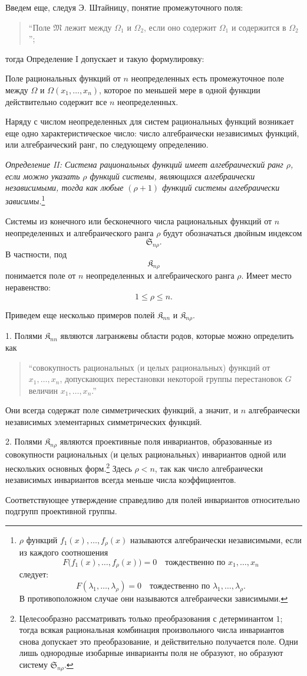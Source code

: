 \documentclass[11pt]{article}
\providecommand{\Kfield}{\mathfrak{K}}
\providecommand{\Ssys}{\mathfrak{S}}
\providecommand{\Mfield}{\mathfrak{M}}
\begin{document}
Введем еще, следуя Э. Штайницу, понятие промежуточного поля:
\begin{quote}
``Поле $\Mfield$ лежит между $\Omega_1$ и $\Omega_2$, если оно содержит $\Omega_1$ и содержится в $\Omega_2$'';
\end{quote}
тогда Определение I допускает и такую формулировку:

Поле рациональных функций от $n$ неопределенных есть промежуточное поле между $\Omega$ и $\Omega(x_1,\ldots,x_n)$, которое по меньшей мере в одной функции действительно содержит все $n$ неопределенных.

Наряду с числом неопределенных для систем рациональных функций возникает еще одно характеристическое число: число алгебраически независимых функций, или алгебраический ранг, по следующему определению.

\emph{Определение II: Система рациональных функций имеет алгебраический ранг $\rho$, если можно указать $\rho$ функций системы, являющихся алгебраически независимыми, тогда как любые $(\rho+1)$ функций системы алгебраически зависимы.}\footnote{$\rho$ функций $f_1(x),\ldots,f_\rho(x)$ называются алгебраически независимыми, если из каждого соотношения
\[
F\bigl(f_1(x),\ldots,f_\rho(x)\bigr)=0\quad\text{тождественно по }x_1,\ldots,x_n
\]
следует:
\[
F(\lambda_1,\ldots,\lambda_\rho)=0\quad\text{тождественно по }\lambda_1,\ldots,\lambda_\rho.
\]
В противоположном случае они называются алгебраически зависимыми.}

Системы из конечного или бесконечного числа рациональных функций от $n$ неопределенных и алгебраического ранга $\rho$ будут обозначаться двойным индексом
\[
  \Ssys_{n\rho}.
\]
В частности, под
\[
  \Kfield_{n\rho}
\]
понимается поле от $n$ неопределенных и алгебраического ранга $\rho$. Имеет место неравенство:
\[
  1\leq \rho\leq n.
\]

Приведем еще несколько примеров полей $\Kfield_{nn}$ и $\Kfield_{n\rho}$.

1. Полями $\Kfield_{nn}$ являются лагранжевы области родов, которые можно определить как
\begin{quote}
``совокупность рациональных (и целых рациональных) функций от $x_1,\ldots,x_n$, допускающих перестановки некоторой группы перестановок $G$ величин $x_1,\ldots,x_n$.''
\end{quote}
Они всегда содержат поле симметрических функций, а значит, и $n$ алгебраически независимых элементарных симметрических функций.

2. Полями $\Kfield_{n\rho}$ являются проективные поля инвариантов, образованные из совокупности рациональных (и целых рациональных) инвариантов одной или нескольких основных форм.\footnote{Целесообразно рассматривать только преобразования с детерминантом $1$; тогда всякая рациональная комбинация произвольного числа инвариантов снова допускает это преобразование, и действительно получается поле. Одни лишь однородные изобарные инварианты поля не образуют, но образуют систему $\Ssys_{n\rho}$.} Здесь $\rho<n$, так как число алгебраически независимых инвариантов всегда меньше числа коэффициентов.

Соответствующее утверждение справедливо для полей инвариантов относительно подгрупп проективной группы.
\end{document}

